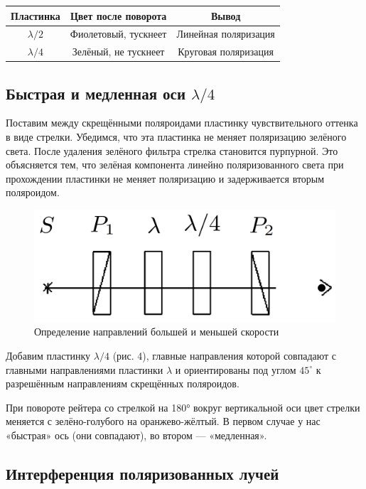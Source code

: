 \begin{table}[h]
    \centering
    \renewcommand{\arrayrulewidth}{0pt}
    \begin{tabular}{|c|c|c|}
        \hline
        \textbf{Пластинка} & \textbf{Цвет после поворота} & \textbf{Вывод} \\  
        \hline \hline
        $ \lambda / 2 $ & Фиолетовый, тускнеет & Линейная поляризация \\  
        \hline
        $ \lambda / 4 $ & Зелёный, не тускнеет & Круговая поляризация \\  
        \hline
    \end{tabular}
    
\end{table}

\subsection*{Быстрая и медленная оси $ \lambda / 4 $}

Поставим между скрещёнными поляроидами пластинку чувствительного оттенка в виде стрелки. Убедимся, что эта пластинка не меняет поляризацию зелёного света. После удаления зелёного фильтра стрелка становится пурпурной. Это объясняется тем, что зелёная компонента линейно поляризованного света при прохождении пластинки не меняет поляризацию и задерживается вторым поляроидом. 

\begin{figure}[h!]
    \centering
	\includegraphics[width=0.5\linewidth]{images/Screenshot_4.png}
	\caption{Определение направлений большей и меньшей скорости}
	\label{pic:4}
\end{figure}

Добавим пластинку $ \lambda / 4 $ (рис. 4), главные направления которой совпадают с главными направлениями пластинки $ \lambda $ и ориентированы под углом $ 45^\circ $ к разрешённым направлениям скрещённых поляроидов.  

При повороте рейтера со стрелкой на 180° вокруг вертикальной оси цвет стрелки меняется с зелёно-голубого на оранжево-жёлтый. В первом случае у нас «быстрая» ось (они совпадают), во втором — «медленная».

\subsection*{Интерференция поляризованных лучей}



